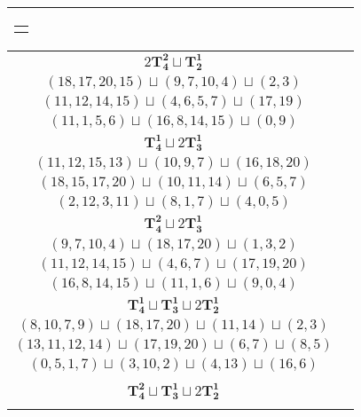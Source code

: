 \documentclass{article}
\begin{document}
\begin{longtable}{|c|c|}
\begin{tabular}{c}
        $(16,8,15,9)\sqcup(10,1,11,6)\sqcup(0,4)$
        \end{tabular} \\ 
        \hline
        $2\mathbf{T_{4}^{2}} \sqcup \mathbf{T_{2}^{1}}$ & \begin{tabular}{c}
        $(18,15,13,14)\sqcup(11,9,12,6)\sqcup(1,2)$ \\ 
        $(18,17,20,15)\sqcup(9,7,10,4)\sqcup(2,3)$ \\ 
        $(11,12,14,15)\sqcup(4,6,5,7)\sqcup(17,19)$ \\ 
        $(11,1,5,6)\sqcup(16,8,14,15)\sqcup(0,9)$
        \end{tabular} \\ 
        \hline
        $\mathbf{T_{4}^{1}} \sqcup 2\mathbf{T_{3}^{1}}$ & \begin{tabular}{c}
        $(16,15,14,13)\sqcup(0,3,5)\sqcup(12,9,6)$ \\ 
        $(11,12,15,13)\sqcup(10,9,7)\sqcup(16,18,20)$ \\ 
        $(18,15,17,20)\sqcup(10,11,14)\sqcup(6,5,7)$ \\ 
        $(2,12,3,11)\sqcup(8,1,7)\sqcup(4,0,5)$
        \end{tabular} \\ 
        \hline
        $\mathbf{T_{4}^{2}} \sqcup 2\mathbf{T_{3}^{1}}$ & \begin{tabular}{c}
        $(11,9,12,6)\sqcup(18,15,13)\sqcup(0,1,2)$ \\ 
        $(9,7,10,4)\sqcup(18,17,20)\sqcup(1,3,2)$ \\ 
        $(11,12,14,15)\sqcup(4,6,7)\sqcup(17,19,20)$ \\ 
        $(16,8,14,15)\sqcup(11,1,6)\sqcup(9,0,4)$
        \end{tabular} \\ 
        \hline
        $\mathbf{T_{4}^{1}} \sqcup \mathbf{T_{3}^{1}} \sqcup 2\mathbf{T_{2}^{1}}$ & \begin{tabular}{c}
        $(8,6,9,11)\sqcup(0,1,2)\sqcup(16,19)\sqcup(18,15)$ \\ 
        $(8,10,7,9)\sqcup(18,17,20)\sqcup(11,14)\sqcup(2,3)$ \\ 
        $(13,11,12,14)\sqcup(17,19,20)\sqcup(6,7)\sqcup(8,5)$ \\ 
        $(0,5,1,7)\sqcup(3,10,2)\sqcup(4,13)\sqcup(16,6)$
        \end{tabular} \\ 
        \hline
        $\mathbf{T_{4}^{2}} \sqcup \mathbf{T_{3}^{1}} \sqcup 2\mathbf{T_{2}^{1}}$ & \begin{tabular}{c}

\end{tabular}
\end{longtable}
\end{document}
